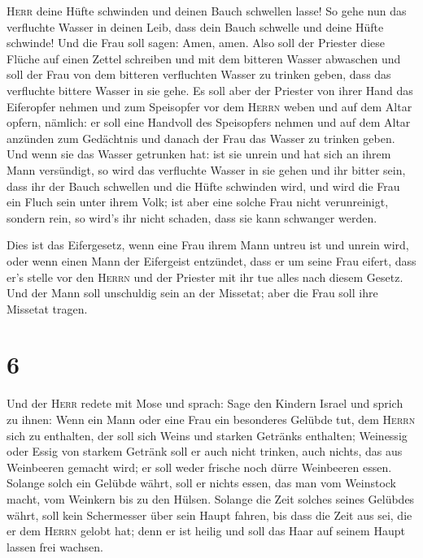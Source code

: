 \textsc{Herr} deine Hüfte schwinden und deinen Bauch schwellen lasse!
 So gehe nun das verfluchte Wasser in deinen Leib, dass
dein Bauch schwelle und deine Hüfte schwinde! Und die Frau soll sagen:
Amen, amen.  Also soll der Priester diese Flüche auf
einen Zettel schreiben und mit dem bitteren Wasser abwaschen
 und soll der Frau von dem bitteren verfluchten Wasser zu
trinken geben, dass das verfluchte bittere Wasser in sie gehe.
 Es soll aber der Priester von ihrer Hand das Eiferopfer
nehmen und zum Speisopfer vor dem \textsc{Herrn} weben und auf dem Altar
opfern, nämlich:  er soll eine Handvoll des Speisopfers
nehmen und auf dem Altar anzünden zum Gedächtnis und danach der Frau das
Wasser zu trinken geben.  Und wenn sie das Wasser
getrunken hat: ist sie unrein und hat sich an ihrem Mann versündigt, so
wird das verfluchte Wasser in sie gehen und ihr bitter sein, dass ihr
der Bauch schwellen und die Hüfte schwinden wird, und wird die Frau ein
Fluch sein unter ihrem Volk;  ist aber eine solche Frau
nicht verunreinigt, sondern rein, so wird's ihr nicht schaden, dass sie
kann schwanger werden.

 Dies ist das Eifergesetz, wenn eine Frau ihrem Mann
untreu ist und unrein wird,  oder wenn einen Mann der
Eifergeist entzündet, dass er um seine Frau eifert, dass er's stelle vor
den \textsc{Herrn} und der Priester mit ihr tue alles nach diesem
Gesetz.  Und der Mann soll unschuldig sein an der
Missetat; aber die Frau soll ihre Missetat tragen.

\hypertarget{section-5}{%
\section{6}\label{section-5}}

 Und der \textsc{Herr} redete mit Mose und sprach:
 Sage den Kindern Israel und sprich zu ihnen: Wenn ein
Mann oder eine Frau ein besonderes Gelübde tut, dem \textsc{Herrn} sich
zu enthalten,  der soll sich Weins und starken Getränks
enthalten; Weinessig oder Essig von starkem Getränk soll er auch nicht
trinken, auch nichts, das aus Weinbeeren gemacht wird; er soll weder
frische noch dürre Weinbeeren essen.  Solange solch ein
Gelübde währt, soll er nichts essen, das man vom Weinstock macht, vom
Weinkern bis zu den Hülsen.  Solange die Zeit solches
seines Gelübdes währt, soll kein Schermesser über sein Haupt fahren, bis
dass die Zeit aus sei, die er dem \textsc{Herrn} gelobt hat; denn er ist
heilig und soll das Haar auf seinem Haupt lassen frei wachsen.

